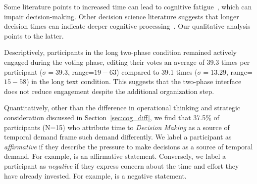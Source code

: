 Some literature points to increased time can lead to cognitive fatigue~\cite{kundingerReliableGroundTruth2020, karim2024examining}, which can impair decision-making. Other decision science literature suggests that longer decision times can indicate deeper cognitive processing~\cite{payneAdaptiveDecisionMaker1993, daniel2017thinking}. Our qualitative analysis points to the latter.

Descriptively, participants in the long two-phase condition remained actively engaged during the voting phase, editing their votes an average of 39.3 times per participant ($\sigma=$39.3, range=$19-63$) compared to 39.1 times ($\sigma=$13.29, range=$15-58$) in the long text condition. This suggests that the two-phase interface does not reduce engagement despite the additional organization step.

Quantitatively, other than the difference in operational thinking and strategic consideration discussed in Section~\ref{sec:cog_diff}, we find that 37.5\% of participants (N=15) who attribute time to \textit{Decision Making} as a source of temporal demand frame such demand differently. We label a participant as \textit{affirmative} if they describe the pressure to make decisions as a source of temporal demand. For example,  is an affirmative statement. Conversely, we label a participant as \textit{negative} if they express concern about the time and effort they have already invested. For example,  is a negative statement.

